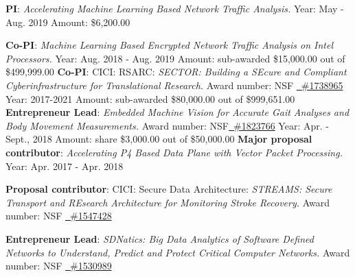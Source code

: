 \documentclass[11pt]{moderncv}
\begin{document}
%
{\textbf{PI}: \textit{Accelerating Machine Learning Based Network Traffic Analysis.} \newline
	Year: May - Aug. 2019 \newline
	Amount: \$6,200.00
}

%
{\textbf{Co-PI}: \textit{Machine Learning Based Encrypted Network Traffic Analysis on Intel Processors.} \newline
Year: Aug. 2018 - Aug. 2019 \newline
Amount: sub-awarded \$15,000.00 out of \$499,999.00
}
%
{\textbf{Co-PI}: CICI: RSARC: \textit{SECTOR: Building a {SE}cure and Compliant {C}yberinfrastructure for {T}ranslati{o}nal {R}esearch.} \newline
	Award number: NSF \href{https://nsf.gov/awardsearch/showAward?AWD_ID=1738965}
	{\color{color2}\homepagesymbol~\#1738965} \newline
	Year: 2017-2021 \newline
	Amount:  sub-awarded \$80,000.00 out of \$999,651.00
}
%
{\textbf{Entrepreneur Lead}: \textit{Embedded Machine Vision for Accurate Gait Analyses and Body Movement Measurements.} \newline
Award number: NSF\href{https://nsf.gov/awardsearch/showAward?AWD_ID=1823766}
  {\color{color2}\homepagesymbol~\#1823766} \newline
Year: Apr. - Sept., 2018 \newline
Amount:  share \$3,000.00 out of \$50,000.00
}
%
{\textbf{Major proposal contributor}: \textit{Accelerating P4 Based Data Plane with Vector Packet Processing.} \newline
Year: Apr. 2017 - Apr. 2018
}

%
{\textbf{Proposal contributor}: CICI: Secure Data Architecture: \textit{STREAMS: Secure Transport and REsearch Architecture for Monitoring Stroke Recovery.} \newline
Award number: NSF \href{https://www.nsf.gov/awardsearch/showAward?AWD_ID=1547428}
  {\color{color2}\homepagesymbol~\#1547428} 
}

%
{\textbf{Entrepreneur Lead}: \textit{SDNatics: Big Data Analytics of Software Defined Networks to Understand, Predict and Protect Critical Computer Networks.} \newline
Award number: NSF \href{https://www.nsf.gov/awardsearch/showAward?AWD_ID=1530989}
    {\color{color2}\homepagesymbol~\#1530989} \newline
}
\end{document}
